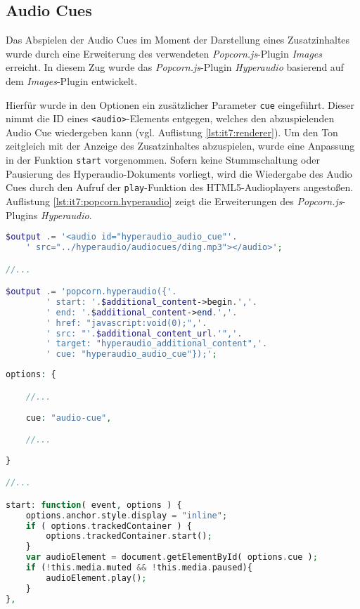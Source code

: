 \subsection{Audio Cues}
Das Abspielen der Audio Cues im Moment der Darstellung eines Zusatzinhaltes wurde durch eine Erweiterung des verwendeten \textit{Popcorn.js}-Plugin \textit{Images} erreicht. In diesem Zug wurde das \textit{Popcorn.js}-Plugin \textit{Hyperaudio} basierend auf dem \textit{Images}-Plugin entwickelt.

Hierfür wurde in den Optionen ein zusätzlicher Parameter \texttt{cue} eingeführt. Dieser nimmt die ID eines \texttt{<audio>}-Elements entgegen, welches den abzuspielenden Audio Cue wiedergeben kann (vgl. Auflistung \ref{lst:it7:renderer}). Um den Ton zeitgleich mit der Anzeige des Zusatzinhaltes abzuspielen, wurde eine Anpassung in der Funktion \texttt{start} vorgenommen. Sofern keine Stummschaltung oder Pausierung des Hyperaudio-Dokuments vorliegt, wird die Wiedergabe des Audio Cues durch den Aufruf der \texttt{play}-Funktion des HTML5-Audioplayers angestoßen. Auflistung \ref{lst:it7:popcorn.hyperaudio} zeigt die Erweiterungen des \textit{Popcorn.js}-Plugins \textit{Hyperaudio}.

\begin{lstlisting}[language=php,
             linewidth=\textwidth,
             caption={Ausschnitt der \textbf{renderer.php} in der 7. Iteration},
             label={lst:it7:renderer}]
$output .= '<audio id="hyperaudio_audio_cue"'.
    ' src="../hyperaudio/audiocues/ding.mp3"></audio>';

//...

$output .= 'popcorn.hyperaudio({'.
        ' start: '.$additional_content->begin.','.
        ' end: '.$additional_content->end.','.
        ' href: "javascript:void(0);",'.
        ' src: "'.$additional_content_url.'",'.
        ' target: "hyperaudio_additional_content",'.
        ' cue: "hyperaudio_audio_cue"});';
\end{lstlisting}

\begin{lstlisting}[language=php,
             linewidth=\textwidth,
             caption={Ausschnitt der \textbf{popcorn.hyperaudio.js} in der 7. Iteration},
             label={lst:it7:popcorn.hyperaudio}]
options: {

    //...
    
    cue: "audio-cue",

    //...    
    
}

//...

start: function( event, options ) {
    options.anchor.style.display = "inline";
    if ( options.trackedContainer ) {
        options.trackedContainer.start();
    }
    var audioElement = document.getElementById( options.cue );
    if (!this.media.muted && !this.media.paused){
        audioElement.play();
    }
},
\end{lstlisting}

